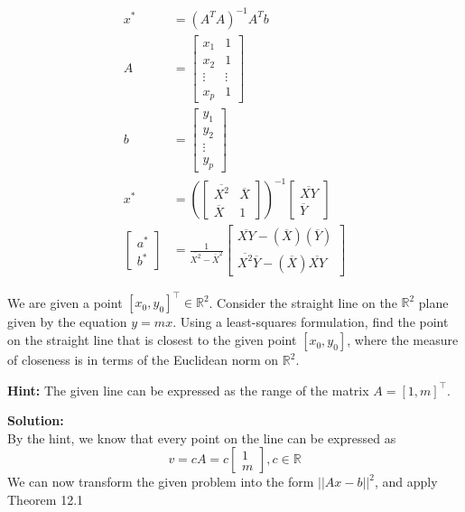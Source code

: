 \documentclass{article}
\begin{document}
\begin{enumerate}
\begin{align*}
x^* &= (A^TA)^{-1} A^T b \\
 A &= \begin{bmatrix}
    x_1 & 1 \\
    x_2 & 1 \\
    \vdots & \vdots \\
    x_p & 1
    \end{bmatrix} \\ b&=\begin{bmatrix}
        y_1 \\ y_2 \\ \vdots \\ y_p
    \end{bmatrix} \\
    x^* &= (\begin{bmatrix}
        \overline{X^2} & \overline{X} \\ \overline{X} & 1 
    \end{bmatrix})^{-1} \begin{bmatrix}
        \overline{XY}
        \\ \overline{Y}
    \end{bmatrix} \\
    \begin{bmatrix}
        a^*\\ b^*
    \end{bmatrix} &= \frac{1}{\overline{X^2} - \overline{X}^2} \begin{bmatrix}
        \overline{XY} - (\overline{X}) (\overline{Y}) \\
        \overline{X^2}\overline{Y} - (\overline{X}) \overline{XY}
    \end{bmatrix}
\end{align*}

\bigbreak

\begin{bb}
\item We are given a point $[x_0, y_0]^\top \in \mathbb{R}^2$. Consider the straight line on the $\mathbb{R}^2$ plane given by the equation $y = mx$. Using a least-squares formulation, find the point on the straight line that is closest to the given point $[x_0, y_0]$, where the measure of closeness is in terms of the Euclidean norm on $\mathbb{R}^2$. 

\textbf{Hint:} The given line can be expressed as the range of the matrix $A = [1, m]^\top$.
\end{bb}

\textbf{Solution: }\\
By the hint, we know that every point on the line can be expressed as $$v = cA = c\begin{bmatrix} 1 \\ m \end{bmatrix}, c\in \mathbb{R} $$
We can now transform the given problem into the form $||Ax-b||^2$, and apply Theorem 12.1


\end{enumerate}
\end{document}
